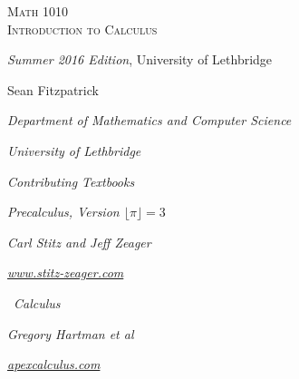 
\hskip 125pt\begin{minipage}{\textwidth}
\begin{flushright}

\textsc{{\Huge Math 1010 \\
Introduction to Calculus}} \\

\bigskip

\textsl{\Large Summer 2016 Edition}, 
{\Large University of Lethbridge}\\


\bigskip

\Large
\vspace{1in}

Sean Fitzpatrick

\emph{\large Department of Mathematics and Computer Science}

\emph{\large University of Lethbridge}\vskip15pt

\parbox{200pt}{\textit{Contributing Textbooks}}\hskip 2cm \phantom{.}

\vspace{0.5in}

\textit{Precalculus, Version $\lfloor \pi\rfloor = 3$}

\emph{\large Carl Stitz and Jeff Zeager}

\emph{\large \href{http://www.stitz-zeager.com}{www.stitz-zeager.com}}\vskip 15pt

\apex\ \textit{Calculus}

\emph{\large Gregory Hartman et al}

\emph{\large \href{http://www.apexcalculus.com}{apexcalculus.com}}\vskip 15pt


\normalsize
\end{flushright}
\end{minipage}

